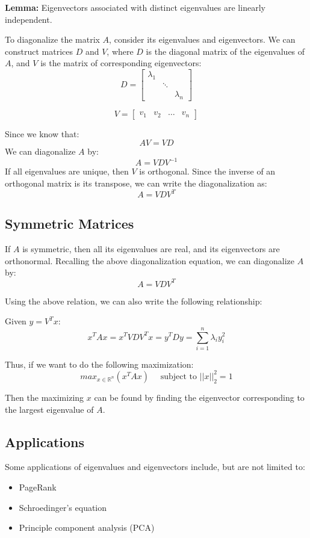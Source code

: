 \documentclass{article}
\begin{document}
\textbf{Lemma:} Eigenvectors associated with distinct eigenvalues are linearly independent.

To diagonalize the matrix $A$, consider its eigenvalues and eigenvectors. We can construct matrices $D$ and $V$, where $D$ is the diagonal matrix of the eigenvalues of $A$, and $V$ is the matrix of corresponding eigenvectors:
$$D=\begin{bmatrix}
    \lambda_1 & & \\
    & \ddots &    \\
    & & \lambda_n
\end{bmatrix}
$$

$$V=\begin{bmatrix}
    v_1 & v_2 & \dots & v_n
\end{bmatrix}
$$

Since we know that:
$$AV=VD$$
We can diagonalize $A$ by:
$$A=VDV^{-1}$$
If all eigenvalues are unique, then $V$ is orthogonal. Since the inverse of an orthogonal matrix is its transpose, we can write the diagonalization as:
$$A=VDV^T$$
\subsection{Symmetric Matrices}
If $A$ is symmetric, then all its eigenvalues are real, and its eigenvectors are orthonormal. Recalling the above diagonalization equation, we can diagonalize $A$ by:
$$A=VDV^T$$

Using the above relation, we can also write the following relationship:

Given $y=V^Tx$:
$$x^TAx=x^TVDV^Tx=y^TDy=\sum_{i=1}^{n} \lambda_i y_i^2$$

Thus, if we want to do the following maximization:
$$ max_{x\in\mathbb{R}^n} (x^TAx) \quad \textrm{ subject to   } ||x||_2^2=1$$

Then the maximizing $x$ can be found by finding the eigenvector corresponding to the largest eigenvalue of $A$.

\subsection{Applications}
Some applications of eigenvalues and eigenvectors include, but are not limited to:
\begin{itemize}
\item PageRank
\item Schroedinger's equation
\item Principle component analysis (PCA)
\end{itemize}
\end{document}
